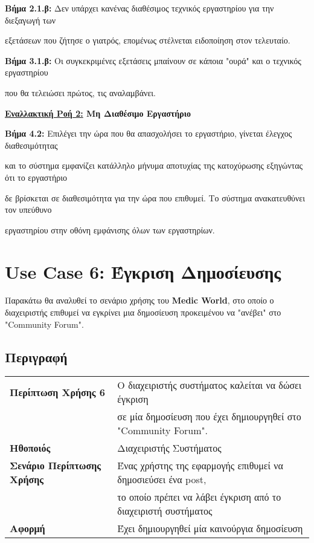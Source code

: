 \documentclass{article}
\newcommand\T{\rule{0pt}{2.6ex}}       %
\newcommand\B{\rule[-1.2ex]{0pt}{0pt}}
\begin{document}
\par \textbf{Βήμα 2.1.β:} Δεν υπάρχει κανένας διαθέσιμος τεχνικός εργαστηρίου για την διεξαγωγή των \par εξετάσεων που ζήτησε ο γιατρός, επομένως στέλνεται ειδοποίηση στον τελευταίο. \vspace{0.1cm}
\par \textbf{Βήμα 3.1.β:} Οι συγκεκριμένες εξετάσεις μπαίνουν σε κάποια "ουρά" και ο τεχνικός εργαστηρίου \par που θα τελειώσει πρώτος, τις αναλαμβάνει.

\textbf{\underline{Εναλλακτική Ροή 2:} Μη Διαθέσιμο Εργαστήριο} \vspace{0.2cm}
\par \textbf{Βήμα 4.2:} Επιλέγει την ώρα που θα απασχολήσει το εργαστήριο, γίνεται έλεγχος διαθεσιμότητας \par και το σύστημα εμφανίζει κατάλληλο μήνυμα αποτυχίας της κατοχύρωσης εξηγώντας ότι το εργαστήριο \par δε βρίσκεται σε διαθεσιμότητα για την ώρα που επιθυμεί. Το σύστημα ανακατευθύνει τον υπεύθυνο \par εργαστηρίου στην οθόνη εμφάνισης όλων των εργαστηρίων. \vspace{0.2cm}

\section{Use Case 6: Έγκριση Δημοσίευσης}

Παρακάτω θα αναλυθεί το σενάριο χρήσης του \textbf{Medic World}, στο οποίο ο διαχειριστής επιθυμεί να εγκρίνει μια δημοσίευση προκειμένου να "ανέβει" στο "Community Forum".



\subsection{Περιγραφή}

\begin{center}
     \begin{tabular}{|l|l|}
     \hline
      \textbf{Περίπτωση Χρήσης 6} & Ο διαχειριστής συστήματος καλείται να δώσει έγκριση \T \\& σε μία δημοσίευση που έχει δημιουργηθεί στο "Community Forum". \B \\ 
      \hline
      \textbf{Ηθοποιός} & Διαχειριστής Συστήματος\T\B \\
      \hline
      \textbf{Σενάριο Περίπτωσης Χρήσης} & Ένας χρήστης της εφαρμογής επιθυμεί να δημοσιεύσει ένα post, \T \\&  το οποίο πρέπει να λάβει έγκριση από το διαχειριστή συστήματος\B \\
      \hline
      \textbf{Αφορμή} & Έχει δημιουργηθεί μία καινούργια δημοσίευση\T\B \\
      \hline
     \end{tabular}
 \end{center}
 
\end{document}
